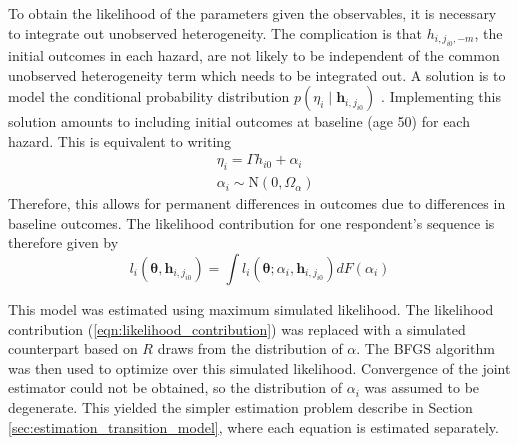 To obtain the likelihood of the parameters given the observables, it is necessary 
to integrate out unobserved heterogeneity. The complication is that 
$h_{i,j_{i0},-m}$, the initial outcomes in each hazard, are not likely to be 
independent of the common unobserved heterogeneity term which needs to be integrated 
out.  A solution is to model the conditional probability distribution 
$p(\eta_i \mid \mathbf{h}_{i,j_{i0}})$ \citep{wooldridge2000framework}. Implementing 
this solution amounts to including initial outcomes at baseline (age 50) for each 
hazard. This is equivalent to writing 
\begin{align*}
&\eta_i = \Gamma h_{i0} + \alpha_i \\
&\alpha_i \sim \mathrm{N}(0, \Omega_\alpha)
\end{align*}
Therefore, this allows for permanent differences in outcomes due to differences in 
baseline outcomes. The likelihood contribution for one respondent's sequence is 
therefore given by
\begin{equation}
l_i(\mathbf{\theta}, \mathbf{h}_{i,j_{i0}}) = \int l_i(\mathbf{\theta}; \alpha_i, \mathbf{h}_{i,j_{i0}})dF(\alpha_i)
\label{eqn:likelihood_contribution}
\end{equation}

This model was estimated using maximum simulated likelihood. The likelihood
contribution (\ref{eqn:likelihood_contribution}) was replaced with a simulated 
counterpart based on $R$ draws from the distribution of $\alpha$. The BFGS
algorithm was then used to optimize over this simulated likelihood. Convergence of
the joint estimator could not be obtained, so the distribution of 
$\alpha_i$ was assumed to be degenerate. This yielded the simpler 
estimation problem describe in Section \ref{sec:estimation_transition_model}, 
where each equation is estimated separately.
